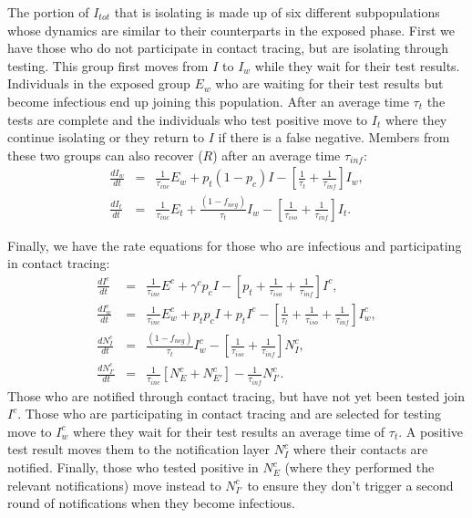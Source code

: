 \documentclass[notitlepage, superscriptaddress]{revtex4-2}
\begin{document}
The portion of $I_{tot}$ that is isolating is made up of six different subpopulations whose dynamics are similar to their counterparts in the exposed phase. First we have those who do not participate in contact tracing, but are isolating through testing. This group first moves from $I$ to $I_{w}$ while they wait for their test results. Individuals in the exposed group $E_{w}$ who are waiting for their test results but become infectious end up joining this population. After an average time $\tau_{t}$ the tests are complete and the individuals who test positive move to $I_{t}$ where they continue isolating or they return to $I$ if there is a false negative. Members from these two groups can also recover ($R$) after an average time $\tau_{inf}$:
\begin{eqnarray}
\label{E:dI_w}
\frac{dI_{w}}{dt} &=& \frac{1}{\tau_{inc}} E_{w} + p_{t} (1 - p_{c}) I - [\frac{1}{\tau_{t}}  + \frac{1}{\tau_{inf}}] I_{w}, \\
%
\frac{dI_{t}}{dt} &=& \frac{1}{\tau_{inc}} E_{t} + \frac{(1- f_{neg})}{\tau_{t}} I_{w} - [\frac{1}{\tau_{iso}}  + \frac{1}{\tau_{inf}}] I_{t}. 
\end{eqnarray}



Finally, we have the rate equations for those who are infectious and participating in contact tracing:
\begin{eqnarray}
\label{E:dIc}
 \frac{dI^{c}}{dt} &=& \frac{1}{\tau_{inc}} E^{c} + \gamma^{c} p_{c} I -[p_{t} +\frac{1}{\tau_{iso}} + \frac{1}{\tau_{inf}}] I^{c}, \\
 \frac{dI^{c}_{w}}{dt} &=& \frac{1}{\tau_{inc}} E^{c}_{w} + p_{t}p_{c} I + p_{t}I^{c} - [\frac{1}{\tau_{t}}  + \frac{1}{\tau_{iso}}  + \frac{1}{\tau_{inf}}] I^{c}_{w}, \\ 
 \frac{dN^{c}_{I}}{dt} &=&  \frac{(1-f_{neg})}{\tau_{t}} I^{c}_{w} - [\frac{1}{\tau_{iso}}  + \frac{1}{\tau_{inf}}] N^{c}_{I}, \\
 \frac{dN^{c}_{I'}}{dt} &=&  \frac{1}{\tau_{inc}} [N^{c}_{E} + N^{c}_{E'}] - \frac{1}{\tau_{inf}}N^{c}_{I'}.
\end{eqnarray}
Those who are notified through contact tracing, but have not yet been tested join $I^{c}$. Those who are participating in contact tracing and are selected for testing move to $I^{c}_{w}$ where they wait for their test results an average time of $\tau_{t}$. A positive test result moves them to the notification layer $N^{c}_{I}$ where their contacts are notified. Finally, those who tested positive in $N^{c}_{E}$ (where they performed the relevant notifications) move instead to $N^{c}_{I'}$ to ensure they don't trigger a second round of notifications when they become infectious.
\end{document}
